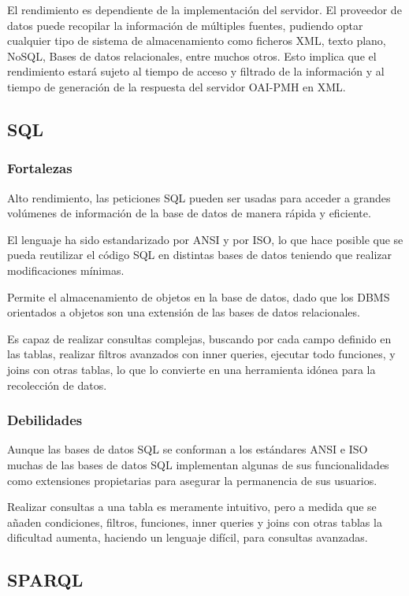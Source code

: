 El rendimiento es dependiente de la implementación del servidor. El proveedor de datos puede recopilar la información de múltiples fuentes, pudiendo optar cualquier tipo de sistema de almacenamiento como ficheros XML, texto plano, NoSQL, Bases de datos relacionales, entre muchos otros. Esto implica que el rendimiento estará sujeto al tiempo de acceso y filtrado de la información y al tiempo de generación de la respuesta del servidor OAI-PMH en XML.

\subsection{SQL}

\subsubsection{Fortalezas}
Alto rendimiento, las peticiones SQL pueden ser usadas para acceder a grandes volúmenes de información de la base de datos de manera rápida y eficiente.

El lenguaje ha sido estandarizado por ANSI y por ISO, lo que hace posible que se pueda reutilizar el código SQL en distintas bases de datos teniendo que realizar modificaciones mínimas.

Permite el almacenamiento de objetos en la base de datos, dado que los DBMS orientados a objetos son una extensión de las bases de datos relacionales.

Es capaz de realizar consultas complejas, buscando por cada campo definido en las tablas, realizar filtros avanzados con inner queries, ejecutar todo funciones, y joins con otras tablas, lo que lo convierte en una herramienta idónea para la recolección de datos.

\subsubsection{Debilidades}

Aunque las bases de datos SQL se conforman a los estándares ANSI e ISO muchas de las bases de datos SQL implementan algunas de sus funcionalidades como extensiones propietarias para asegurar la permanencia de sus usuarios.

Realizar consultas a una tabla es meramente intuitivo, pero a medida que se añaden condiciones, filtros, funciones, inner queries y joins con otras tablas la dificultad aumenta, haciendo un lenguaje difícil, para consultas avanzadas.

\subsection{SPARQL}

